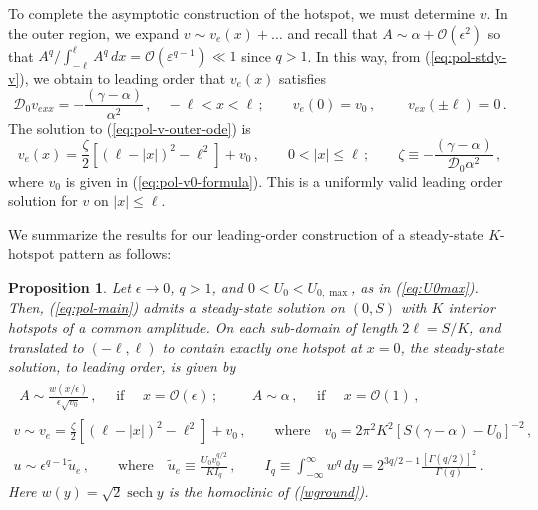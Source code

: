 \documentclass{article}%
\newtheorem{prop}[theorem]{Proposition}
\newcommand{\eps}{{\displaystyle \varepsilon}}
\DeclareMathOperator{\sech}{sech}
\newcommand{\bsub}{\begin{subequations}}
\newcommand{\esub}{\end{subequations}$\!$}
\begin{document}
To complete the asymptotic construction of the hotspot, we must
determine $v$. In the outer region, we expand $v\sim v_{e}(x)+\dots$
and recall that $A\sim\alpha+{\mathcal O}(\epsilon^{2})$ so that
${A^q/\int_{-\ell}^{\ell} A^q \, dx}={\mathcal O}(\eps^{q-1})\ll 1$
since $q>1$. In this way, from (\ref{eq:pol-stdy-v}), we obtain to
leading order that $v_{e}(x)$ satisfies
\begin{equation}
 {\mathcal D}_{0}v_{exx}=-\frac{\left(\gamma-\alpha\right)}{\alpha^{2}} 
  \,, \quad -\ell <x<\ell \,; \qquad
v_{e}(0)=v_{0}\,,\; \qquad v_{ex}(\pm \ell)=0 \,. \label{eq:pol-v-outer-ode}
\end{equation}
The solution to (\ref{eq:pol-v-outer-ode}) is
\begin{equation}
v_{e}(x)=\frac{\zeta}{2}\left[\left(\ell-|x|\right)^{2}-\ell^{2}\right]+v_{0}
\,, \qquad 0<|x|\leq\ell \,; \qquad \zeta \equiv -
\frac{(\gamma-\alpha)}{{\mathcal D}_0 \alpha^2} \,, \label{eq:pol-v-outer-sol}
\end{equation}
where $v_{0}$ is given in (\ref{eq:pol-v0-formula}). This is
a uniformly valid leading order solution for $v$ on $|x|\leq \ell$.

We summarize the results for our leading-order construction of a
steady-state $K$-hotspot pattern as follows:

\begin{prop}
\label{thm: pol-symm-K-hotspots-for-main} Let $\epsilon\to 0$, $q>1$,
and $0<U_0<U_{0,\max}$, as in (\ref{eq:U0max}). Then,
(\ref{eq:pol-main}) admits a steady-state solution on $(0,S)$ with $K$
interior hotspots of a common amplitude. On each sub-domain of length
$2\ell=S/K$, and translated to $(-\ell,\ell)$ to contain exactly one
hotspot at $x=0$, the steady-state solution, to leading order, is
given by
\bsub\label{thm:main_eq}
\begin{gather}
\begin{gathered}A\sim\frac{w(x/\epsilon)}{\epsilon \sqrt{v_{0}}}\,, \quad
\mbox{ if }\quad x={\mathcal O}(\epsilon)\,;\end{gathered}
\qquad A\sim\alpha\,, \quad \mbox{ if } \quad x={\mathcal O}(1)\,, \\
v\sim v_{e}=\frac{\zeta}{2}\left[\left(\ell-|x|\right)^{2}-\ell^{2}\right]+v_{0}
  \,, \qquad \mbox{where} \quad 
  v_{0}=2\pi^{2}K^2 \left[S(\gamma-\alpha)-U_{0}\right]^{-2}\,,\\
u\sim\epsilon^{q-1}\tilde{u}_{e}\,, \qquad \mbox{where} \quad
  \tilde{u}_{e}\equiv\frac{U_{0} v_{0}^{q/2}}{K I_{q}} \,, \qquad 
 I_{q}\equiv \int_{-\infty}^{\infty} w^q \, dy =
  2^{3q/2-1}\frac{\left[\Gamma(q/2)\right]^2}{\Gamma(q)} \,.
\end{gather}
\esub Here $w(y)=\sqrt{2}\sech y$ is the homoclinic of (\ref{wground}).
\end{prop}
\end{document}
